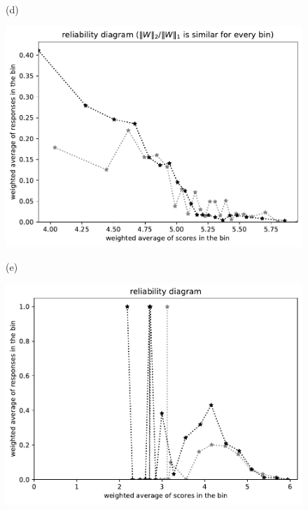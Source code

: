 \documentclass{article}
\newlength{\vertsep}
\newlength{\imsize}
\begin{document}
\begin{figure}
\begin{centering}
(d)
\parbox{\imsize}{\includegraphics[width=\imsize]
{../codes/weighted/County_of_San_Francisco_vs_San_Mateo-LNGI/equierrs20.pdf}}
\quad\quad
(e)
\parbox{\imsize}{\includegraphics[width=\imsize]
{../codes/weighted/County_of_San_Francisco_vs_San_Mateo-LNGI/equiscores20.pdf}}

\vspace{\vertsep}


\end{centering}
\end{figure}
\end{document}
